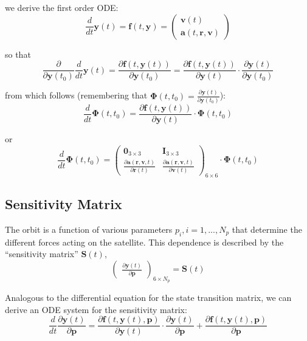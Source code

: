 we derive the first order ODE:
\begin{equation}
  \frac{d}{dt} \bm{y}(t) = \bm{f}(t, \bm{y}) 
    = \begin{pmatrix} \bm{v}(t) \\ \bm{a}(t,\bm{r}, \bm{v}) \end{pmatrix}
\end{equation}

so that
\begin{equation}
  \frac{\partial}{\partial \bm{y}(t_0)} \frac{d}{dt} \bm{y}(t) = 
  \frac{\partial \bm{f}(t, \bm{y}(t))}{\partial \bm{y}(t_0)} = 
  \frac{\partial \bm{f}(t, \bm{y}(t))}{\partial \bm{y}(t)} \cdot 
  \frac{\partial \bm{y}(t)}{\partial \bm{y}(t_0)}
\end{equation}

from which follows (remembering that $\bm{\Phi}(t,t_0) = \frac{\partial \bm{y}(t)}{\partial \bm{y}(t_0)}$):
\begin{equation}
  \frac{d}{dt} \bm{\Phi}(t,t_0) = 
  \frac{\partial \bm{f}(t, \bm{y}(t))}{\partial \bm{y}(t)} \cdot 
  \bm{\Phi}(t,t_0)
\end{equation}

or
\begin{equation}
  \frac{d}{dt} \bm{\Phi}(t,t_0) = \begin{pmatrix}
    \bm{0}_{3 \times 3} & \bm{I}_{3 \times 3} \\
    \frac{\partial \bm{a}(\bm{r}, \bm{v}, t)}{\partial \bm{r}(t)} & 
    \frac{\partial \bm{a}(\bm{r}, \bm{v}, t)}{\partial \bm{v}(t)}
  \end{pmatrix}_{6 \times 6} \cdot \bm{\Phi}(t,t_0)
\end{equation}

\subsection{Sensitivity Matrix}
\label{ssec:ode-sensitivity-matrix}

The orbit is a function of various parameters $p_i, i=1,...,N_p$ that determine 
the different forces acting on the satellite. This dependence is described by 
the ``sensitivity matrix'' $\bm{S}(t)$,
\begin{equation}
  \begin{pmatrix}
    \frac{\partial \bm{y}(t)}{\partial \bm{p}}
  \end{pmatrix}_{6 \times N_p}
  = \bm{S}(t)
\end{equation}

Analogous to the differential equation for the state transition matrix, we can 
derive an ODE system for the sensitivity matrix:
\begin{equation}
  \frac{d}{dt}\frac{\partial \bm{y}(t)}{\partial \bm{p}} = 
  \frac{\partial \bm{f}(t, \bm{y}(t), \bm{p})}{\partial \bm{y}(t)} 
  \cdot \frac{\partial \bm{y}(t)}{\partial \bm{p}} 
  + \frac{\partial \bm{f}(t, \bm{y}(t), \bm{p})}{\partial \bm{p}} 
\end{equation}

